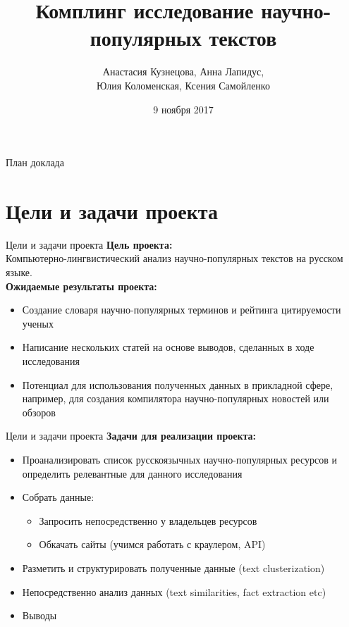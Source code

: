 \documentclass{beamer}
\title[Научно-исследовательский семинар]{Комплинг исследование научно-популярных текстов}
\author{Анастасия Кузнецова, Анна Лапидус, \\ Юлия Коломенская, Ксения Самойленко}
\institute{НИУ ВШЭ}
\date{9 ноября 2017}
\begin{document}
\begin{frame}
  \titlepage
\end{frame}

\begin{frame}{План доклада}
  \tableofcontents
\end{frame}

\section{Цели и задачи проекта}

\begin{frame}{Цели и задачи проекта}
\textbf{Цель проекта:} \\
Компьютерно-лингвистический анализ научно-популярных текстов на русском языке.\\
\textbf{Ожидаемые результаты проекта:} \\
\begin{itemize}
\item Создание словаря научно-популярных терминов и рейтинга цитируемости ученых
\item Написание нескольких статей на основе выводов, сделанных в ходе исследования
\item Потенциал для использования полученных данных в прикладной сфере, например, для создания компилятора научно-популярных новостей или обзоров
\end{itemize}

\end{frame}

\begin{frame}{Цели и задачи проекта}
\textbf{Задачи для реализации проекта:} \\
\begin{itemize}
\item Проанализировать список русскоязычных научно-популярных ресурсов и определить релевантные для данного исследования
\item Собрать данные:
	\begin{itemize}
	\item Запросить непосредственно у владельцев ресурсов
    \item Обкачать сайты (учимся работать с краулером, API)
	\end{itemize}
\item Разметить и структурировать полученные данные (text clusterization)
\item Непосредственно анализ данных (text similarities, fact extraction etc)
\item Выводы
\end{itemize}

\end{frame}
\end{document}

